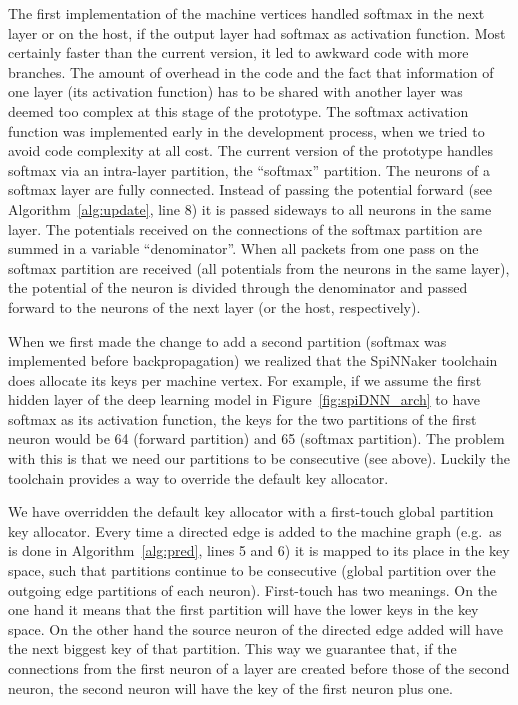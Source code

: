 \documentclass[]{article}
\begin{document}
The first implementation of the machine vertices handled softmax
in the next layer or on the host, if the output layer had softmax as
activation function.
Most certainly faster than the current version, it led to awkward
code with more branches.
The amount of overhead in the code and the fact that information
of one layer (its activation function) has to be shared with another
layer was deemed too complex at this stage of the prototype.
The softmax activation function was implemented early in the
development process, when we tried to avoid code complexity at all
cost.
The current version of the prototype handles softmax via an
intra-layer partition, the ``softmax'' partition.
The neurons of a softmax layer are fully connected.
Instead of passing the potential forward (see
Algorithm~\ref{alg:update}, line 8) it is passed sideways to all
neurons in the same layer.
The potentials received on the connections of the softmax partition
are summed in a variable ``denominator''.
When all packets from one pass on the softmax partition are received
(all potentials from the neurons in the same layer), the potential of
the neuron is divided through the denominator and passed forward to
the neurons of the next layer (or the host, respectively).

When we first made the change to add a second partition (softmax
was implemented before backpropagation) we realized that the
SpiNNaker toolchain does allocate its keys per machine vertex.
For example, if we assume the first hidden layer of the deep learning
model in Figure~\ref{fig:spiDNN_arch} to have softmax as its
activation function, the keys for the two partitions of the first
neuron would be 64 (forward partition) and 65 (softmax partition).
The problem with this is that we need our partitions to be
consecutive (see above).
Luckily the toolchain provides a way to override the default key
allocator.

We have overridden the default key allocator with a first-touch
global partition key allocator.
Every time a directed edge is added to the machine graph (e.g.\ as
is done in Algorithm~\ref{alg:pred}, lines 5 and 6) it is mapped to
its place in the key space, such that partitions continue to be
consecutive (global partition over the outgoing edge partitions of
each neuron).
First-touch has two meanings.
On the one hand it means that the first partition will have the lower
keys in the key space.
On the other hand the source neuron of the directed edge added will
have the next biggest key of that partition.
This way we guarantee that, if the connections from the first neuron
of a layer are created before those of the second neuron, the second
neuron will have the key of the first neuron plus one.
\end{document}
